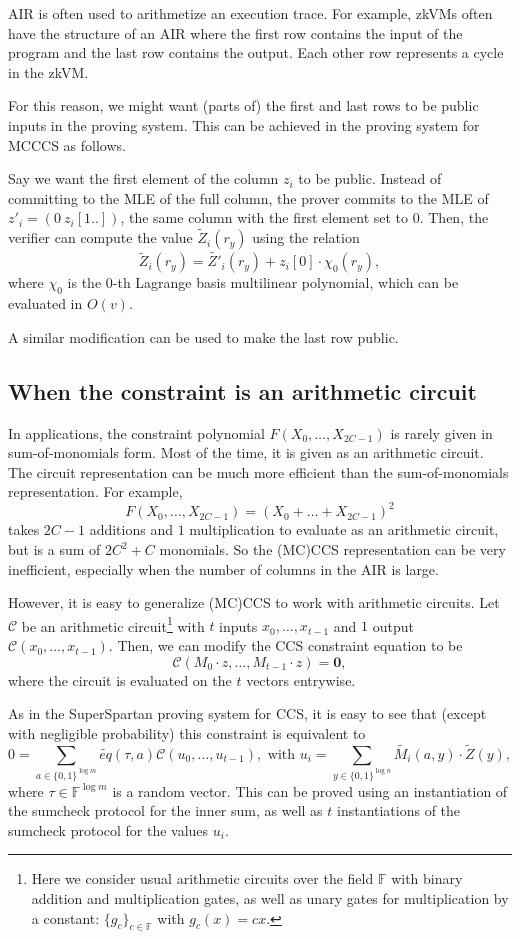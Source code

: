 \documentclass[a4paper]{article}
\begin{document}
AIR is often used to arithmetize an execution trace. For example, zkVMs often have the structure of an AIR where the first row contains the input of the program and the last row contains the output. Each other row represents a cycle in the zkVM. 

For this reason, we might want (parts of) the first and last rows to be public inputs in the proving system. This can be achieved in the proving system for MCCCS as follows. 

Say we want the first element of the column $z_i$ to be public. Instead of committing to the MLE of the full column, the prover commits to the MLE of $z'_i = (0 \ z_i[1..])$, the same column with the first element set to 0. Then, the verifier can compute the value $\widetilde{Z}_i(r_y)$ using the relation
$$\widetilde{Z}_i(r_y) = \widetilde{Z'}_i(r_y) + z_i[0]\cdot \chi_0(r_y),$$
where $\chi_0$ is the 0-th Lagrange basis multilinear polynomial, which can be evaluated in $O(v)$. 

A similar modification can be used to make the last row public.

\subsection*{When the constraint is an arithmetic circuit}

In applications, the constraint polynomial $F(X_0,\dots, X_{2C-1})$ is rarely given in sum-of-monomials form. Most of the time, it is given as an arithmetic circuit. The circuit representation can be much more efficient than the sum-of-monomials representation. For example, 
$$ F(X_0,\dots, X_{2C-1}) = (X_0 + \dots + X_{2C-1})^2$$
takes $2C-1$ additions and $1$ multiplication to evaluate as an arithmetic circuit, but is a sum of $2C^2+C$ monomials. So the (MC)CCS representation can be very inefficient, especially when the number of columns in the AIR is large.

However, it is easy to generalize (MC)CCS to work with arithmetic circuits. Let $\mathcal{C}$ be an arithmetic circuit\footnote{Here we consider usual arithmetic circuits over the field $\mathbb{F}$ with binary addition and multiplication gates, as well as unary gates for multiplication by a constant: $\{g_c\}_{c\in \mathbb{F}}$ with $g_c(x) = cx$.} with $t$ inputs $x_0,\dots,x_{t-1}$ and $1$ output $\mathcal{C}(x_0,\dots,x_{t-1})$. Then, we can modify the CCS constraint equation to be
$$
\mathcal{C}(M_0\cdot z, \dots, M_{t-1}\cdot z) = \mathbf{0},
$$
where the circuit is evaluated on the $t$ vectors entrywise.

As in the SuperSpartan proving system for CCS, it is easy to see that (except with negligible probability) this constraint is equivalent to 
$$
0 = \sum_{a \in \{0,1\}^{\log m}} \widetilde{eq}(\tau,a) \mathcal{C}\left( u_0, \dots, u_{t-1}\right), \text{ with } u_i= \sum_{y \in \{0,1\}^{\log n}} \widetilde{M_i}(a,y)\cdot \widetilde{Z}(y),
$$
where $\tau\in \mathbb{F}^{\log m}$ is a random vector. This can be proved using an instantiation of the sumcheck protocol for the inner sum, as well as $t$ instantiations of the sumcheck protocol for the values $u_i$. 




\end{document}
